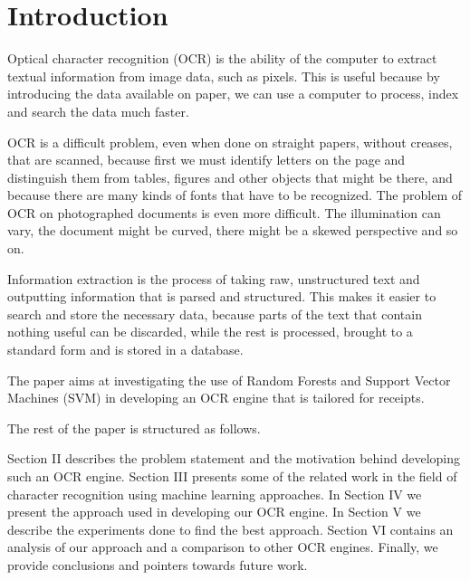 \section{Introduction}
Optical character recognition (OCR) is the ability of the computer to extract textual information from image data, such as pixels. This is useful because by introducing the data available on paper, we can use a computer to process, index and search the data much faster.  

OCR is a difficult problem, even when done on straight papers, without creases, that are scanned, because first we must identify letters on the page and distinguish them from tables, figures and other objects that might be there, and because there are many kinds of fonts that have to be recognized. The problem of OCR on photographed documents is even more difficult. The illumination can vary, the document might be curved, there might be a skewed perspective and so on. 

Information extraction is the process of taking raw, unstructured text and outputting information that is parsed and structured. This makes it easier to search and store the necessary data, because parts of the text that contain nothing useful can be discarded, while the rest is processed, brought to a standard form and is stored in a database. 

The paper aims at investigating the use of Random Forests and Support Vector Machines (SVM) in developing an OCR engine that is tailored for receipts. 

The rest of the paper is structured as follows.

Section II describes the problem statement and the motivation behind developing such an OCR engine. Section III presents some of the related work in the field of character recognition using machine learning approaches. In Section IV we present the approach used in developing our OCR engine. In Section V we describe the experiments done to find the best approach. Section VI contains an analysis of our approach and a comparison to other OCR engines. Finally, we provide conclusions and pointers towards future work. 
